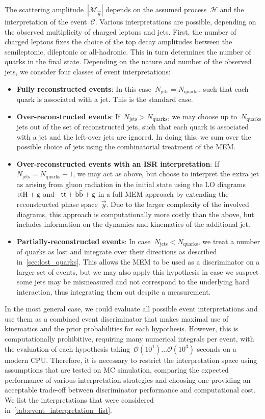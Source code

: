 The scattering amplitude~$|\mathcal{M}_{\vec{\theta}}|$ depends on the assumed process~$\mathcal{H}$ and the interpretation of the event~$\mathcal{C}$. Various interpretations are possible, depending on the observed multiplicity of charged leptons and jets. First, the number of charged leptons fixes the choice of the top decay amplitudes between the semileptonic, dileptonic or all-hadronic. This in turn determines the number of quarks in the final state. Depending on the nature and number of the observed jets, we consider four classes of event interpretations:

\begin{itemize}
\item \textbf{Fully reconstructed events}: In this case~$N_{\mathrm{jets}} = N_{\mathrm{quarks}}$, such that each quark is associated with a jet. This is the standard case.
\item \textbf{Over-reconstructed events}: If~$N_{\mathrm{jets}} > N_{\mathrm{quarks}}$, we may choose up to~$N_{\mathrm{quarks}}$ jets out of the set of reconstructed jets, such that each quark is associated with a jet and the left-over jets are ignored. In doing this, we sum over the possible choice of jets using the combinatorial treatment of the MEM.
\item \textbf{Over-reconstructed events with an ISR interpretation}: If~$N_{\mathrm{jets}} = N_{\mathrm{quarks}} + 1$, we may act as above, but choose to interpret the extra jet as arising from gluon radiation in the initial state using the LO diagrams~$\mathrm{t} \bar{\mathrm{t}} \mathrm{H} + \mathrm{g}$ and ~$\mathrm{t} \bar{\mathrm{t}} + \mathrm{b}\bar{\mathrm{b}} + \mathrm{g}$ in a full MEM approach by extending the reconstructed phase space~$\vec{y}$. Due to the larger complexity of the involved diagrams, this approach is computationally more costly than the above, but includes information on the dynamics and kinematics of the additional jet.
\item \textbf{Partially-reconstructed events}: In case~$N_{\mathrm{jets}} < N_{\mathrm{quarks}}$, we treat a number of quarks as lost and integrate over their directions as described in~\cref{sec:lost_quarks}. This allows the MEM to be used as a discriminator on a larger set of events, but we may also apply this hypothesis in case we suspect some jets may be mismeasured and not correspond to the underlying hard interaction, thus integrating them out despite a measurement.
\end{itemize}

In the most general case, we could evaluate all possible event interpretations and use them as a combined event discriminator that makes maximal use of kinematics and the prior probabilities for each hypothesis. However, this is computationally prohibitive, requiring many numerical integrals per event, with the evaluation of each hypothesis taking~$\mathcal{O}(10^1)\dots \mathcal{O}(10^3)$ seconds on a modern CPU. Therefore, it is necessary to restrict the interpretation space using assumptions that are tested on MC simulation, comparing the expected performance of various interpretation strategies and choosing one providing an acceptable trade-off between discriminator performance and computational cost. We list the interpretations that were considered in~\cref{tab:event_interpretation_list}.

